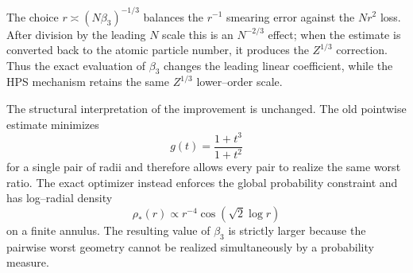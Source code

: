 \begin{remark}
The choice $r\asymp(N\beta_3)^{-1/3}$ balances the $r^{-1}$ smearing error against the $Nr^2$ loss.  After division by the leading $N$ scale this is an $N^{-2/3}$ effect; when the estimate is converted back to the atomic particle number, it produces the $Z^{1/3}$ correction.  Thus the exact evaluation of $\beta_3$ changes the leading linear coefficient, while the HPS mechanism retains the same $Z^{1/3}$ lower--order scale.
\end{remark}

The structural interpretation of the improvement is unchanged.  The old pointwise estimate minimizes
\[
 g(t)=\frac{1+t^3}{1+t^2}
\]
for a single pair of radii and therefore allows every pair to realize the same worst ratio.  The exact optimizer instead enforces the global probability constraint and has log--radial density
\[
 \rho_*(r)\propto r^{-4}\cos(\sqrt2\log r)
\]
on a finite annulus.  The resulting value of $\beta_3$ is strictly larger because the pairwise worst geometry cannot be realized simultaneously by a probability measure.
